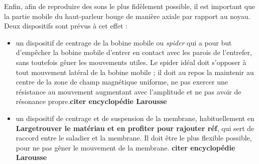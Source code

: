Enfin, afin de reproduire des sons le plus fidèlement possible, il est important que la partie mobile du haut-parleur bouge de manière axiale par rapport au noyau.
Deux dispositifs sont prévus à cet effet : 
\begin{itemize}
\item un dispositif de centrage de la bobine mobile ou \textit{spider} qui \og a pour but d’empêcher la bobine mobile d’entrer en contact avec les parois de l’entrefer, sans toutefois gêner les mouvements utiles. Le spider idéal doit s’opposer à tout mouvement latéral de la bobine mobile ; il doit au repos la maintenir au centre de la zone de champ magnétique uniforme, ne pas exercer une résistance au mouvement augmentant avec l’amplitude et ne pas avoir de résonance propre.\fg \textbf{\large{citer encyclopédie Larousse}}
\item un dispositif de centrage et de suspension de la membrane, habituellement en \textbf{Large{trouver le matériau et en profiter pour rajouter réf}}, qui sert de raccord entre le saladier et la membrane. Il doit être le plus flexible possible, pour ne pas gêner le mouvement de la membrane. \textbf{\large{citer encyclopédie Larousse}}
\end{itemize}






